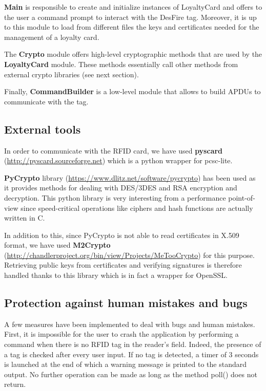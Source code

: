 \documentclass[a4paper,11pt,oneside]{article}
\begin{document}
\textbf{Main} is responsible to create and initialize instances of LoyaltyCard and offers to the user a command prompt to interact with the DesFire tag. Moreover, it is up to this module to load from different files the keys and certificates needed for the management of a loyalty card. 

The \textbf{Crypto} module offers high-level cryptographic methods that are used by the \textbf{LoyaltyCard} module. These methods essentially call other methods from external crypto libraries (see next section). 

Finally, \textbf{CommandBuilder} is a low-level module that allows to build APDUs to communicate with the tag. 



\subsection{External tools}

In order to communicate with the RFID card, we have used \textbf{pyscard} (\url{http://pyscard.sourceforge.net}) which is a python wrapper for pcsc-lite. 

\textbf{PyCrypto} library (\url{https://www.dlitz.net/software/pycrypto}) has been used as it provides methods for dealing with DES/3DES and RSA encryption and decryption. This python library is very interesting from a performance point-of-view since speed-critical operations like ciphers and hash functions are actually written in C. 

In addition to this, since PyCrypto is not able to read certificates in X.509 format, we have used \textbf{M2Crypto} (\url{http://chandlerproject.org/bin/view/Projects/MeTooCrypto}) for this purpose. Retrieving public keys from certificates and verifying signatures is therefore handled thanks to this library which is in fact a wrapper for OpenSSL. 

\subsection{Protection against human mistakes and bugs}

A few measures have been implemented to deal with bugs and human mistakes. First, it is impossible for the user to crash the application by performing a command when there is no RFID tag in the reader's field. Indeed, the presence of a tag is checked after every user input. If no tag is detected, a timer of 3 seconds is launched at the end of which a warning message is printed to the standard output. No further operation can be made as long as the method poll() does not return. 
\end{document}
